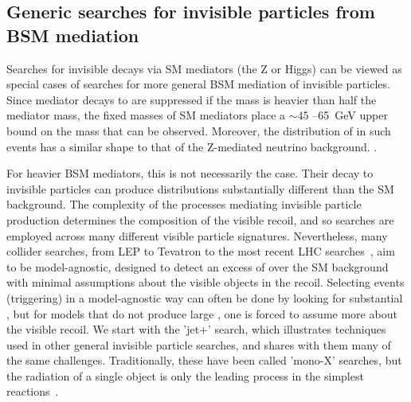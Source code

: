 \subsection{Generic searches for invisible particles from BSM mediation}
\label{sec:results_monoXSearches}

Searches for invisible decays via SM mediators (the Z or Higgs) can be viewed as special cases of searches for more general BSM mediation of invisible particles.
Since mediator decays to \IP are suppressed if the \IP mass is heavier than half the mediator mass, the fixed masses of SM mediators place a $\sim45$ --65~GeV upper bound on the \IP mass that can be observed.
Moreover, the distribution of \MET in such events has a similar shape to that of the Z-mediated neutrino background.
.%



For heavier BSM mediators, this is not necessarily the case.
Their decay to invisible particles can produce \MET distributions substantially different than the SM background.
The complexity of the processes mediating invisible particle production determines the composition of the visible recoil, and so searches are employed across many different visible particle signatures. 
Nevertheless, many collider searches, from LEP to Tevatron to the most recent LHC searches~\cite{Fox:2011fx,Beltran:2010ww,Bai:2010hh}, aim to be model-agnostic, designed to detect an excess of \MET over the SM background with minimal assumptions about the visible objects in the recoil.
Selecting events (triggering) in a model-agnostic way can often be done by looking for substantial \MET, but for models that do not produce large \MET, one is forced to assume more about the visible recoil.
We start with the 'jet+\MET' search, which illustrates techniques used in other general invisible particle searches, and shares with them many of the same challenges.
Traditionally, these have been called 'mono-X' searches, but the radiation of a single object is only the leading process in the simplest reactions~\cite{Haisch:2013ata}. 

\begin{marginnote}[]
\end{marginnote}

